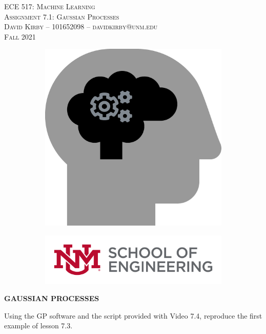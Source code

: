 \documentclass[11pt]{article}
\begin{document}
\setmainfont{SF Pro Text}
\setsansfont{SF Pro Text}
\setmonofont{SF Mono}
\renewcommand{\familydefault}{\sfdefault}

\thispagestyle{empty}
\begin{titlepage}
\vspace*{\fill}
\begin{center}
\textsc{\Huge{ECE 517: Machine Learning}}\\[3em]
\textsc{\LARGE Assignment 7.1: Gaussian Processes}\\[6em]
\textsc{\Large David Kirby -- 101652098 -- davidkirby@unm.edu}\\[3em]
\textsc{\Large Fall 2021}
\end{center}
\vfill
\begin{figure}[h]
\begin{subfigure}{0.5\textwidth}
\includegraphics[width=0.25\linewidth]{learning.png}
\end{subfigure}
\begin{subfigure}{0.6\textwidth}\hspace{1em}
\includegraphics[width=0.8\linewidth]{new-soe-logo.png}
\end{subfigure}
\end{figure}
\end{titlepage}
\setcounter{figure}{0}

\hypersetup{
    linkcolor=CrispBlue,
    urlcolor=CrispBlue,
    breaklinks=true
}

\textbf{GAUSSIAN PROCESSES}

Using the GP software and the script provided with Video 7.4, reproduce the first example of lesson 7.3.
\end{document}
